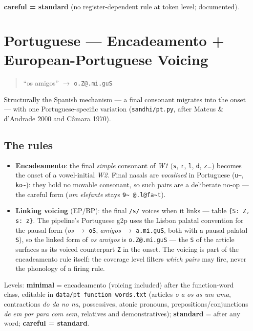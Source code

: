 \documentclass[11pt,a4paper]{report}
\newcommand{\smp}[1]{\texttt{#1}}          %
\newcommand{\tld}{\textasciitilde{}}      %
\begin{document}
\textbf{careful = standard} (no register-dependent rule at token level;
documented).

\chapter{Portuguese — Encadeamento + European-Portuguese Voicing}
\label{chap:pt}

\begin{quote}\large``os amigos'' $\rightarrow$ \smp{o.Z@.mi.guS}\end{quote}

\noindent Structurally the Spanish mechanism — a final consonant migrates
into the onset — with one Portuguese-specific variation
(\smp{sandhi/pt.py}, after Mateus \& d'Andrade 2000 and C\^amara 1970).

\section{The rules}

\begin{itemize}
  \item \textbf{Encadeamento}: the final \emph{simple} consonant of
        \emph{W1} (\smp{s}, \smp{r}, \smp{l}, \smp{d}, \smp{z}\dots) becomes
        the onset of a vowel-initial \emph{W2}. Final nasals are
        \emph{vocalised} in Portuguese (\smp{u\tld}, \smp{ko\tld}): they
        hold no movable consonant, so such pairs are a deliberate no-op —
        the careful form (\emph{um elefante} stays
        \smp{9\tld{} @.l@fa\tld{}t}).
  \item \textbf{Linking voicing} (EP/BP): the final \smp{/s/} voices when
        it links — table \smp{\{S: Z, s: z\}}. The pipeline's Portuguese
        g2p uses the Lisbon palatal convention for the pausal form
        (\emph{os} $\rightarrow$ \smp{oS}, \emph{amigos}
        $\rightarrow$ \smp{a.mi.guS}, both with a pausal palatal \smp{S}),
        so the linked form of \emph{os amigos} is
        \smp{o.Z@.mi.guS} — the \smp{S} of the article surfaces as its
        voiced counterpart \smp{Z} in the onset. The voicing is part of
        the encadeamento rule
        itself: the coverage level filters \emph{which pairs} may fire,
        never the phonology of a firing rule.
\end{itemize}

Levels: \textbf{minimal} = encadeamento (voicing included) after the
function-word class, editable in \smp{data/pt\_function\_words.txt}
(articles \emph{o a os as um uma}, contractions \emph{do da no na},
possessives, atonic pronouns, prepositions/conjunctions \emph{de em por
para com sem}, relatives and demonstratives); \textbf{standard} = after any
word; \textbf{careful = standard}.
\end{document}
